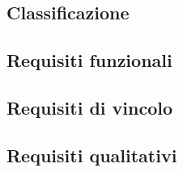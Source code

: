 \subsection{Classificazione}

\subsection{Requisiti funzionali}

\subsection{Requisiti di vincolo}

\subsection*{Requisiti qualitativi}
